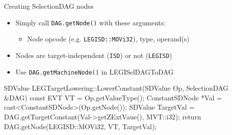 
\begin{frame}[fragile]{Creating SelectionDAG nodes}

\begin{itemize}
    \item Simply call \texttt{DAG.getNode()} with these arguments:
    \begin{itemize}
        \item Node opcode (e.g. \texttt{LEGISD::MOVi32}), type, operand(s)
    \end{itemize}
    \item Nodes are target-independent (\texttt{ISD}) or not (\texttt{LEGISD})
    \item Use \texttt{DAG.getMachineNode()} in LEGISelDAGToDAG
\end{itemize}

\begin{codebox}
SDValue LEGTargetLowering::LowerConstant(SDValue Op,
                                         SelectionDAG &DAG) const {
  EVT VT = Op.getValueType();
  ConstantSDNode *Val = cast<ConstantSDNode>(Op.getNode());
  SDValue TargetVal = DAG.getTargetConstant(Val->getZExtVaue(),
                                            MVT::i32);
  return DAG.getNode(LEGISD::MOVi32, VT, TargetVal);
}
\end{codebox}

\end{frame}


